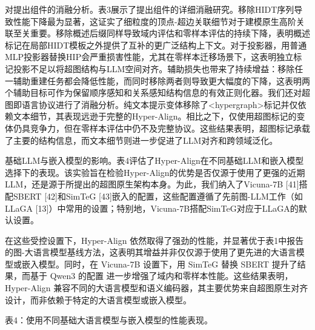 \documentclass[10pt]{article}
\begin{document}
对提出组件的消融分析。表3展示了提出组件的详细消融研究。移除HIDT序列导致性能下降最为显著，这证实了细粒度的顶点-超边关联细节对于建模原生高阶关联至关重要。移除概述后缀同样导致域内评估和零样本评估的持续下降，表明概述标记在局部HIDT模板之外提供了互补的更广泛结构上下文。对于投影器，用普通MLP投影器替换HIP会严重损害性能，尤其在零样本迁移场景下，这表明独立标记投影不足以将超图结构与LLM空间对齐。辅助损失也带来了持续增益：移除任一辅助重建任务都会降低性能，而同时移除两者则导致更大幅度的下降，这表明两个辅助目标可作为保留顺序感知和关系感知结构信息的有效正则化器。我们还对超图即语言协议进行了消融分析。纯文本提示变体移除了<hypergraph>标记并仅依赖文本细节，其表现远逊于完整的Hyper-Align。相比之下，仅使用超图标记的变体仍具竞争力，但在零样本评估中仍不及完整协议。这些结果表明，超图标记承载了主要的结构信息，而文本细节则进一步促进了LLM对齐和跨领域泛化。

基础LLM与嵌入模型的影响。表4评估了Hyper-Align在不同基础LLM和嵌入模型选择下的表现。该实验旨在检验Hyper-Align的优势是否仅源于使用了更强的近期LLM，还是源于所提出的超图原生架构本身。为此，我们纳入了Vicuna-7B [41]搭配SBERT [42]和SimTeG [43]嵌入的配置，这些配置遵循了先前图-LLM工作（如LLaGA [13]）中常用的设置；特别地，Vicuna-7B搭配SimTeG对应于LLaGA的默认设置。

在这些受控设置下，Hyper-Align 依然取得了强劲的性能，并显著优于表1中报告的图-大语言模型基线方法，这表明其增益并非仅仅源于使用了更先进的大语言模型或嵌入模型。同时，在 Vicuna-7B 设置下，用 SimTeG 替换 SBERT 提升了结果，而基于 Qwen3 的配置  进一步增强了域内和零样本性能。这些结果表明，Hyper-Align 兼容不同的大语言模型和语义编码器，其主要优势来自超图原生对齐设计，而非依赖于特定的大语言模型或嵌入模型。

表4：使用不同基础大语言模型与嵌入模型的性能表现。

\begin{center}
\end{center}
\end{document}
